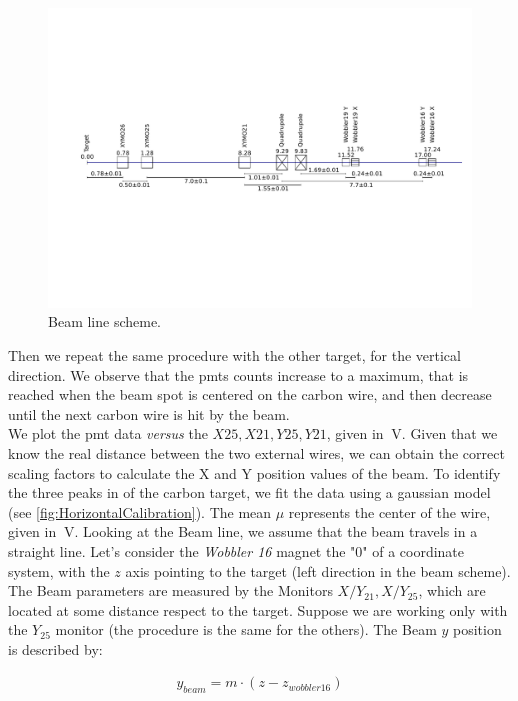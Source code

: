 \begin{figure}[hbtp]
\centering
\includegraphics[scale=0.4]{figures/XYMOCalibBeamLine.svg.pdf}
\caption{Beam line scheme.}
\label{fig:BeamLine}
\end{figure}


 Then we repeat the same procedure with the other target, for the vertical direction. We observe that the pmts counts increase to a maximum, that is reached when the beam spot is centered on the carbon wire, and then decrease until the next carbon wire is hit by the beam.\\
We plot the pmt data \textit{versus} the $X25,X21,Y25,Y21$, given in $\SI{}{\volt}$. 
Given that we know the real distance between the two external wires, we can obtain the correct scaling factors to calculate the X and Y position values ​​of the beam. To identify the three peaks in of the carbon target, we fit the data using a gaussian model (see \ref{fig:HorizontalCalibration}). The mean $\mu$ represents the center of the wire, given in $\SI{}{\volt}$.
Looking at the Beam line, we assume that the beam travels in a straight line. Let's consider the \textit{Wobbler 16} magnet the "$0$" of a coordinate system, with the $z$ axis pointing to the target (left direction in the beam scheme). The Beam parameters are measured by the Monitors $X/Y_{21}, X/Y_{25}$, which are located at some distance respect to the target. Suppose we are working only with the $Y_{25}$ monitor (the procedure is the same for the others). The Beam $y$ position is described by:

\begin{align*}
y_{beam} = m \cdot (z - z_{wobbler 16})
\end{align*}

